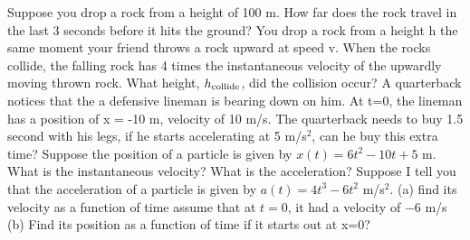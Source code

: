 \documentclass[12pt]{article}
\begin{document}
\pagestyle{empty}
\noindent Suppose you drop a rock from a height of 100 m.  How far does
  the rock travel in the last 3 seconds before it hits the ground?
\newpage
\noindent You drop a rock from a height h the same moment your friend
  throws a rock upward at speed v.  When the rocks collide, the
  falling rock has 4 times the instantaneous velocity of the upwardly
  moving thrown rock. What height, $h_{\rm collide}$, did the
  collision occur?
\newpage
\noindent A quarterback notices that the a defensive lineman is bearing
  down on him.  At t=0, the lineman has a position of x = -10 m,
  velocity of 10 m/s.  The quarterback needs to buy 1.5 second with his
  legs, if he starts accelerating at 5 m/s$^2$, can he buy this extra
  time?
\newpage
\noindent Suppose the position of a particle is given by $x(t) = 6 t^2 -
  10 t + 5$ m.  What is the instantaneous velocity?  What is the
  acceleration?
\newpage
\noindent Suppose I tell you that the acceleration of a particle is given
  by $a(t) = 4 t^3 - 6t^2$ m/s$^{2}$. (a) find its velocity as a
  function of time assume that at $t=0$, it had a velocity of $-6$ m/s
  (b) Find its position as a function of time if it starts out at x=0?
\end{document}
